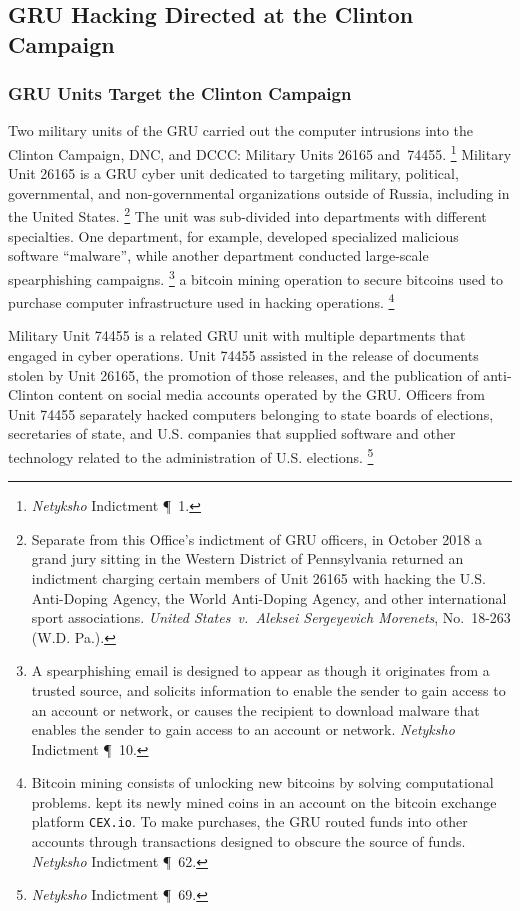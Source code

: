 \subsection{GRU Hacking Directed at the Clinton Campaign}

\subsubsection{GRU Units Target the Clinton Campaign}

Two military units of the GRU carried out the computer intrusions into the Clinton Campaign, DNC, and DCCC: Military Units 26165 and~74455.%
\footnote{\textit{Netyksho} Indictment \P~1.}
Military Unit 26165 is a GRU cyber unit dedicated to targeting military, political, governmental, and non-governmental organizations outside of Russia, including in the United States.%
\footnote{Separate from this Office's indictment of GRU officers, in October 2018 a grand jury sitting in the Western District of Pennsylvania returned an indictment charging certain members of Unit 26165 with hacking the U.S. Anti-Doping Agency, the World Anti-Doping Agency, and other international sport associations.
\textit{United States~v.\ Aleksei Sergeyevich Morenets}, No.~18-263 (W.D. Pa.).}
The unit was sub-divided into departments with different specialties.
One department, for example, developed specialized malicious software ``malware'', while another department conducted large-scale spearphishing campaigns.%
\footnote{A spearphishing email is designed to appear as though it originates from a trusted source, and solicits information to enable the sender to gain access to an account or network, or causes the recipient to download malware that enables the sender to gain access to an account or network.
\textit{Netyksho} Indictment \P~10.}
 a bitcoin mining operation to secure bitcoins used to purchase computer infrastructure used in hacking operations.%
\footnote{Bitcoin mining consists of unlocking new bitcoins by solving computational problems.
 kept its newly mined coins in an account on the bitcoin exchange platform \verb+CEX.io+.
To make purchases, the GRU routed funds into other accounts through transactions designed to obscure the source
of funds.
\textit{Netyksho} Indictment \P~62.}

Military Unit 74455 is a related GRU unit with multiple departments that engaged in cyber operations.
Unit 74455 assisted in the release of documents stolen by Unit 26165, the promotion of those releases, and the publication of anti-Clinton content on social media accounts operated by the GRU\null.
Officers from Unit 74455 separately hacked computers belonging to state boards of elections, secretaries of state, and U.S. companies that supplied software and other technology related to the administration of U.S. elections.%
\footnote{\textit{Netyksho} Indictment \P~69.}

